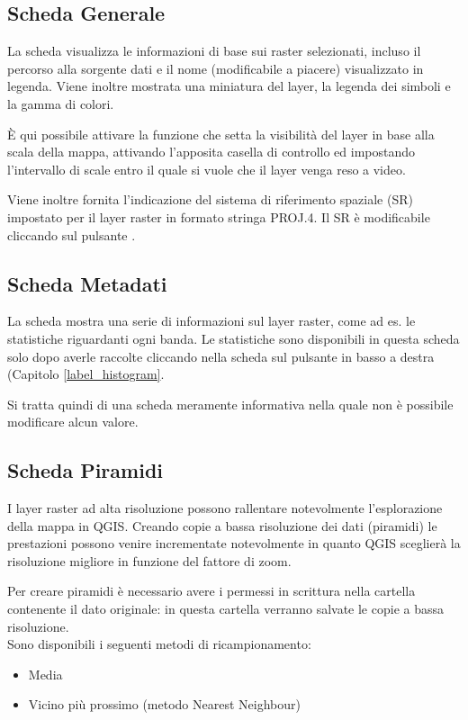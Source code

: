 \subsection{Scheda Generale}\label{label_generaltab}

La scheda  visualizza le informazioni di base sui raster selezionati,
incluso il percorso alla sorgente dati e il nome (modificabile a
piacere) visualizzato in legenda. Viene inoltre mostrata una miniatura del layer, 
la legenda dei simboli e la gamma di colori. 

È qui possibile attivare la funzione che setta la visibilità del layer
in base alla scala della mappa, attivando l'apposita casella di controllo ed
impostando l'intervallo di scale entro il quale si vuole che il layer venga
reso a video.

Viene inoltre fornita l'indicazione del sistema di riferimento spaziale (SR)
impostato per il layer raster in formato stringa PROJ.4. Il SR è modificabile
cliccando sul pulsante .

\subsection{Scheda Metadati}\label{label_metatab}

La scheda  mostra una serie di informazioni sul layer
raster, come ad es. le statistiche riguardanti ogni banda. Le statistiche sono
disponibili in questa scheda solo dopo averle raccolte cliccando nella
scheda  sul pulsante  in basso a destra 
(Capitolo \ref{label_histogram}.

Si tratta quindi di una scheda meramente informativa nella quale non è
possibile modificare alcun valore.

\subsection{Scheda Piramidi}\label{raster_pyramids}

I layer raster ad alta risoluzione possono rallentare notevolmente
l'esplorazione della mappa in QGIS. Creando copie a bassa risoluzione dei dati 
(piramidi) le prestazioni possono venire incrementate notevolmente in quanto 
QGIS sceglierà la risoluzione migliore in funzione del fattore di zoom.

Per creare piramidi è necessario avere i permessi in scrittura nella cartella 
contenente il dato originale: in questa cartella verranno salvate le copie a 
bassa risoluzione. \\
Sono disponibili i seguenti metodi di ricampionamento:
\begin{itemize}
\item Media
\item Vicino più prossimo (metodo Nearest Neighbour)
\end{itemize}

